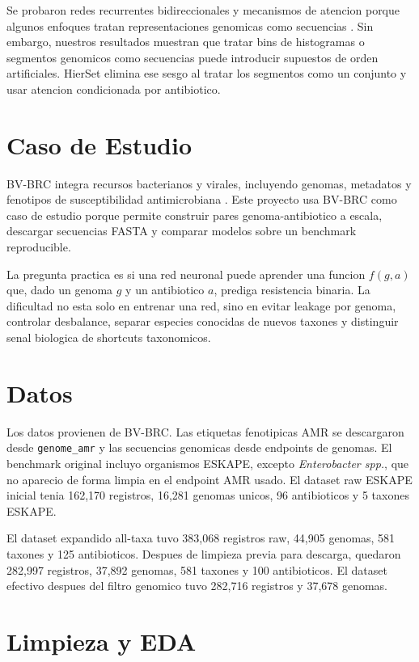\documentclass[journal,transmag]{../ieee_latex_template/IEEEtran}
\begin{document}
Se probaron redes recurrentes bidireccionales y mecanismos de atencion porque algunos enfoques tratan representaciones genomicas como secuencias \cite{schuster1997,cho2014,bahdanau2015,lugo2021}. Sin embargo, nuestros resultados muestran que tratar bins de histogramas o segmentos genomicos como secuencias puede introducir supuestos de orden artificiales. HierSet elimina ese sesgo al tratar los segmentos como un conjunto y usar atencion condicionada por antibiotico.

\section{Caso de Estudio}
BV-BRC integra recursos bacterianos y virales, incluyendo genomas, metadatos y fenotipos de susceptibilidad antimicrobiana \cite{olson2023bvbrc}. Este proyecto usa BV-BRC como caso de estudio porque permite construir pares genoma-antibiotico a escala, descargar secuencias FASTA y comparar modelos sobre un benchmark reproducible.

La pregunta practica es si una red neuronal puede aprender una funcion $f(g,a)$ que, dado un genoma $g$ y un antibiotico $a$, prediga resistencia binaria. La dificultad no esta solo en entrenar una red, sino en evitar leakage por genoma, controlar desbalance, separar especies conocidas de nuevos taxones y distinguir senal biologica de shortcuts taxonomicos.

\section{Datos}
Los datos provienen de BV-BRC. Las etiquetas fenotipicas AMR se descargaron desde \texttt{genome\_amr} y las secuencias genomicas desde endpoints de genomas. El benchmark original incluyo organismos ESKAPE, excepto \textit{Enterobacter spp.}, que no aparecio de forma limpia en el endpoint AMR usado. El dataset raw ESKAPE inicial tenia 162,170 registros, 16,281 genomas unicos, 96 antibioticos y 5 taxones ESKAPE.

El dataset expandido all-taxa tuvo 383,068 registros raw, 44,905 genomas, 581 taxones y 125 antibioticos. Despues de limpieza previa para descarga, quedaron 282,997 registros, 37,892 genomas, 581 taxones y 100 antibioticos. El dataset efectivo despues del filtro genomico tuvo 282,716 registros y 37,678 genomas.

\section{Limpieza y EDA}
\end{document}

